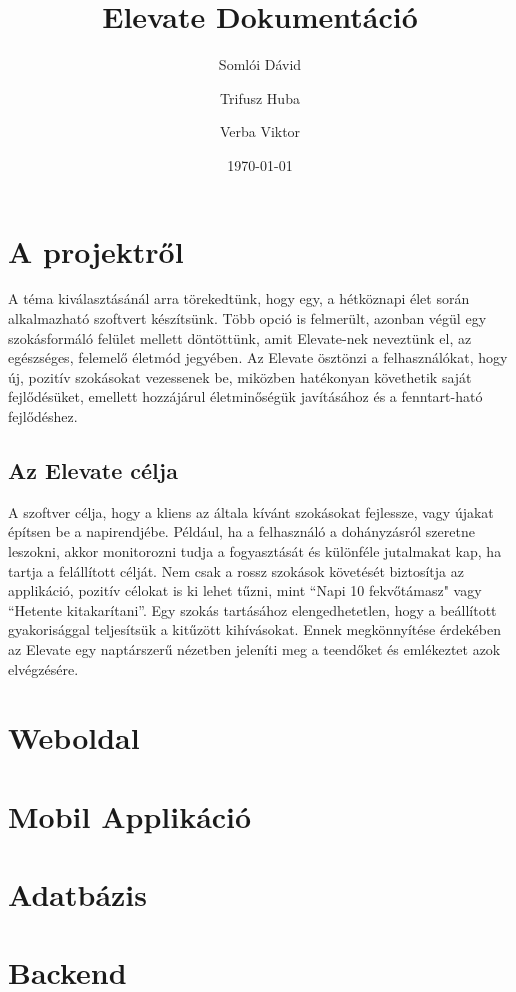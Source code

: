 \documentclass[12pt]{report}
\begin{document}
\title{Elevate Dokumentáció}
\author{Somlói Dávid
        \and
        Trifusz Huba
        \and
        Verba Viktor}
\date{\today}

\maketitle

\setcounter{tocdepth}{3}
\tableofcontents

\chapter{A projektről}
A téma kiválasztásánál arra törekedtünk, hogy egy, a hétköznapi élet során alkalmazható szoftvert készítsünk. Több opció is felmerült, azonban végül egy szokásformáló felület mellett döntöttünk, amit Elevate-nek neveztünk el, az egészséges, felemelő életmód jegyében. Az Elevate ösztönzi a felhasználókat, hogy új, pozitív szokásokat vezessenek be, miközben hatékonyan követhetik saját fejlődésüket, emellett hozzájárul életminőségük javításához és a fenntart-ható fejlődéshez.
\section{Az Elevate célja}
A szoftver célja, hogy a kliens az általa kívánt szokásokat fejlessze, vagy újakat építsen be a napirendjébe. Például, ha a felhasználó a dohányzásról szeretne leszokni, akkor monitorozni tudja a fogyasztását és különféle jutalmakat kap, ha tartja a felállított célját. Nem csak a rossz szokások követését biztosítja az applikáció, pozitív célokat is ki lehet tűzni, mint “Napi 10 fekvőtámasz" vagy “Hetente kitakarítani”. Egy szokás tartásához elengedhetetlen, hogy a beállított gyakorisággal teljesítsük a kitűzött kihívásokat. Ennek megkönnyítése érdekében az Elevate egy naptárszerű nézetben jeleníti meg a teendőket és emlékeztet azok elvégzésére. 
\chapter{Weboldal}
\chapter{Mobil Applikáció}
\chapter{Adatbázis}
\chapter{Backend}
\end{document}
